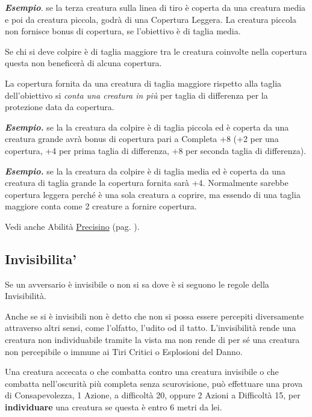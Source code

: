 \begin{multicols}{2}
\textbf{\textit{Esempio}}. se la terza creatura sulla linea di tiro è coperta da una creatura media e poi da creatura piccola, godrà di una Copertura Leggera. La creatura piccola non fornisce bonus di copertura, se l'obiettivo è di taglia media.

Se chi si deve colpire è di taglia maggiore tra le creatura coinvolte nella copertura questa non beneficerà di alcuna copertura.

La copertura fornita da una creatura di taglia maggiore rispetto alla taglia dell'obiettivo si \emph{conta una creatura in più} per taglia di differenza per la protezione data da copertura.

\textbf{\textit{Esempio.}} se la la creatura da colpire è di taglia piccola ed è coperta da una creatura grande avrà bonus di copertura pari a Completa +8 (+2 per una copertura, +4 per prima taglia di differenza, +8 per seconda taglia di differenza).

\textbf{\textit{Esempio.}} se la la creatura da colpire è di taglia media ed è coperta da una creatura di taglia grande la copertura fornita sarà +4. Normalmente sarebbe copertura leggera perché è una sola creatura a coprire, ma essendo di una taglia maggiore conta come 2 creature a fornire copertura.

Vedi anche Abilità \hyperlink{Precisino}{Precisino} (pag. \pageref{Precisino}).

\subsection{Invisibilita'} \hypertarget{invisibilita}{}\label{invisibilita}

Se un avversario è invisibile o non si sa dove è si seguono le regole della Invisibilità.

Anche se si è invisibili non è detto che non si possa essere percepiti diversamente attraverso altri sensi, come l'olfatto, l'udito od il tatto. L'invisibilità rende una creatura non individuabile tramite la vista ma non rende di per sé una creatura non percepibile o immune ai Tiri Critici o Esplosioni del Danno.

Una creatura accecata o che combatta contro una creatura invisibile o che combatta nell'oscurità più completa senza scurovisione, può effettuare una prova di Consapevolezza, 1 Azione, a difficoltà 20, oppure 2 Azioni a Difficoltà 15, per \textbf{individuare} una creatura se questa è entro 6 metri da lei.


\end{multicols}
